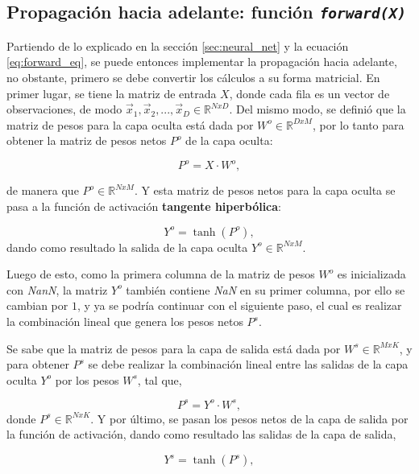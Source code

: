 \documentclass{article}
\begin{document}
\newpage
\subsection{Propagación hacia adelante: función \texttt{\textit{forward(X)}}}

Partiendo de lo explicado en la sección \ref{sec:neural_net} y la ecuación \ref{eq:forward_eq}, se puede entonces implementar la propagación hacia adelante, no obstante, primero se debe convertir los cálculos a su forma matricial. En primer lugar, se tiene la matriz de entrada $X$, donde cada fila es un vector de observaciones, de modo $\vec{x}_1, \vec{x}_2,...,\vec{x}_D \in \mathbb{R}^{NxD}$. Del mismo modo, se definió que la matriz de pesos para la capa oculta está dada por $W^o \in \mathbb{R}^{DxM}$, por lo tanto para obtener la matriz de pesos netos $P^o$ de la capa oculta:

\begin{equation}
    P^o = X \cdot W^o,
\end{equation}

\noindent
de manera que $P^o \in \mathbb{R}^{NxM}$. Y esta matriz de pesos netos para la capa oculta se pasa a la función de activación \textbf{tangente hiperbólica}:

\begin{equation}
    Y^o = \tanh{(P^o)},
\end{equation}
\noindent
dando como resultado la salida de la capa oculta $Y^o \in \mathbb{R}^{NxM}$.

Luego de esto, como la primera columna de la matriz de pesos $W^o$ es inicializada con \textit{NanN}, la matriz $Y^o$ también contiene \textit{NaN} en su primer columna, por ello se cambian por $1$, y ya se podría continuar con el siguiente paso, el cual es realizar la combinación lineal que genera los pesos netos $P^s$.

Se sabe que la matriz de pesos para la capa de salida está dada por $W^s \in \mathbb{R}^{MxK}$, y para obtener $P^s$ se debe realizar la combinación lineal entre las salidas de la capa oculta $Y^o$ por los pesos $W^s$, tal que,

\begin{equation}
    P^s = Y^o \cdot W^s,
\end{equation}
\noindent
donde $P^s \in \mathbb{R}^{NxK}$. Y por último, se pasan los pesos netos de la capa de salida por la función de activación, dando como resultado las salidas de la capa de salida,

\begin{equation}
    Y^s = \tanh{(P^s)},
\end{equation}
\end{document}

